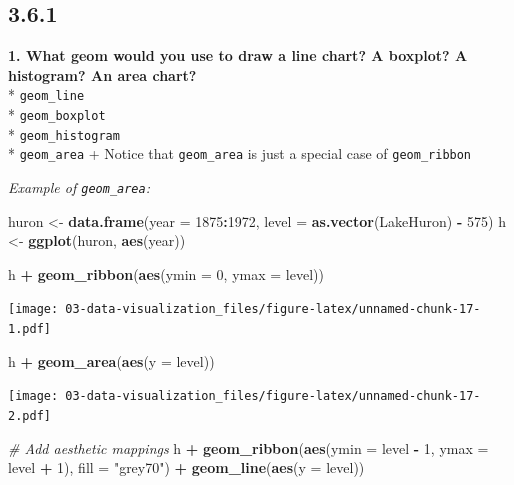 \documentclass[]{book}
\newenvironment{Shaded}{\begin{snugshade}}{\end{snugshade}}
\newcommand{\CommentTok}[1]{\textcolor[rgb]{0.56,0.35,0.01}{\textit{#1}}}
\newcommand{\DataTypeTok}[1]{\textcolor[rgb]{0.13,0.29,0.53}{#1}}
\newcommand{\DecValTok}[1]{\textcolor[rgb]{0.00,0.00,0.81}{#1}}
\newcommand{\KeywordTok}[1]{\textcolor[rgb]{0.13,0.29,0.53}{\textbf{#1}}}
\newcommand{\NormalTok}[1]{#1}
\newcommand{\OperatorTok}[1]{\textcolor[rgb]{0.81,0.36,0.00}{\textbf{#1}}}
\newcommand{\StringTok}[1]{\textcolor[rgb]{0.31,0.60,0.02}{#1}}
\theoremstyle{definition}
\theoremstyle{definition}
\theoremstyle{definition}
\theoremstyle{remark}
\begin{document}
\hypertarget{section-3}{%
\subsection{3.6.1}\label{section-3}}

\textbf{1. What geom would you use to draw a line chart? A boxplot? A
histogram? An area chart?}\\
* \texttt{geom\_line}\\
* \texttt{geom\_boxplot}\\
* \texttt{geom\_histogram}\\
* \texttt{geom\_area} + Notice that \texttt{geom\_area} is just a
special case of \texttt{geom\_ribbon}

\emph{Example of \texttt{geom\_area}:}

\begin{Shaded}
\begin{Highlighting}[]
\NormalTok{huron <-}\StringTok{ }\KeywordTok{data.frame}\NormalTok{(}\DataTypeTok{year =} \DecValTok{1875}\OperatorTok{:}\DecValTok{1972}\NormalTok{, }\DataTypeTok{level =} \KeywordTok{as.vector}\NormalTok{(LakeHuron) }\OperatorTok{-}\StringTok{ }\DecValTok{575}\NormalTok{)}
\NormalTok{h <-}\StringTok{ }\KeywordTok{ggplot}\NormalTok{(huron, }\KeywordTok{aes}\NormalTok{(year))}

\NormalTok{h }\OperatorTok{+}\StringTok{ }\KeywordTok{geom_ribbon}\NormalTok{(}\KeywordTok{aes}\NormalTok{(}\DataTypeTok{ymin =} \DecValTok{0}\NormalTok{, }\DataTypeTok{ymax =}\NormalTok{ level))}
\end{Highlighting}
\end{Shaded}

\texttt{[image: 03-data-visualization\_files/figure-latex/unnamed-chunk-17-1.pdf]}

\begin{Shaded}
\begin{Highlighting}[]
\NormalTok{h }\OperatorTok{+}\StringTok{ }\KeywordTok{geom_area}\NormalTok{(}\KeywordTok{aes}\NormalTok{(}\DataTypeTok{y =}\NormalTok{ level))}
\end{Highlighting}
\end{Shaded}

\texttt{[image: 03-data-visualization\_files/figure-latex/unnamed-chunk-17-2.pdf]}

\begin{Shaded}
\begin{Highlighting}[]
\CommentTok{# Add aesthetic mappings}
\NormalTok{h }\OperatorTok{+}
\StringTok{  }\KeywordTok{geom_ribbon}\NormalTok{(}\KeywordTok{aes}\NormalTok{(}\DataTypeTok{ymin =}\NormalTok{ level }\OperatorTok{-}\StringTok{ }\DecValTok{1}\NormalTok{, }\DataTypeTok{ymax =}\NormalTok{ level }\OperatorTok{+}\StringTok{ }\DecValTok{1}\NormalTok{), }\DataTypeTok{fill =} \StringTok{"grey70"}\NormalTok{) }\OperatorTok{+}
\StringTok{  }\KeywordTok{geom_line}\NormalTok{(}\KeywordTok{aes}\NormalTok{(}\DataTypeTok{y =}\NormalTok{ level))}
\end{Highlighting}
\end{Shaded}
\end{document}

